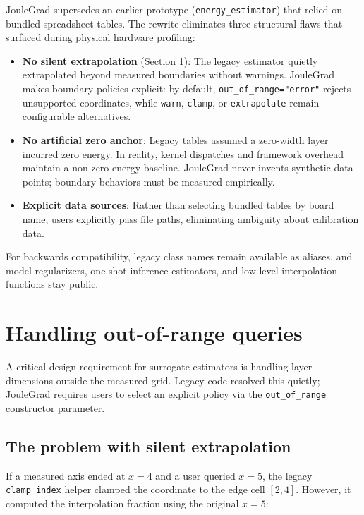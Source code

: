 JouleGrad supersedes an earlier prototype (\texttt{energy\_estimator}) that relied on bundled spreadsheet tables. The rewrite eliminates three structural flaws that surfaced during physical hardware profiling:

\begin{itemize}
    \item \textbf{No silent extrapolation} (Section \ref{sec:extrapolate_section}): The legacy estimator quietly extrapolated beyond measured boundaries without warnings. JouleGrad makes boundary policies explicit: by default, \texttt{out\_of\_range="error"} rejects unsupported coordinates, while \texttt{warn}, \texttt{clamp}, or \texttt{extrapolate} remain configurable alternatives.
    \item \textbf{No artificial zero anchor}: Legacy tables assumed a zero-width layer incurred zero energy. In reality, kernel dispatches and framework overhead maintain a non-zero energy baseline. JouleGrad never invents synthetic data points; boundary behaviors must be measured empirically.
    \item \textbf{Explicit data sources}: Rather than selecting bundled tables by board name, users explicitly pass file paths, eliminating ambiguity about calibration data.
\end{itemize}

For backwards compatibility, legacy class names remain available as aliases, and model regularizers, one-shot inference estimators, and low-level interpolation functions stay public.

\section{Handling out-of-range queries} \label{sec:extrapolate_section}

A critical design requirement for surrogate estimators is handling layer dimensions outside the measured grid. Legacy code resolved this quietly; JouleGrad requires users to select an explicit policy via the \texttt{out\_of\_range} constructor parameter.

\subsection{The problem with silent extrapolation}

If a measured axis ended at $x = 4$ and a user queried $x = 5$, the legacy \texttt{clamp\_index} helper clamped the coordinate to the edge cell $[2, 4]$. However, it computed the interpolation fraction using the original $x = 5$:

